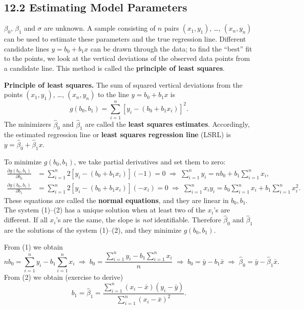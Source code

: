 \subsection*{12.2 Estimating Model Parameters}

$\beta_0$, $\beta_1$ and $\sigma$ are unknown. A sample consisting of $n$ pairs $(x_1,y_1)$, \dots, $(x_n,y_n)$ can be used to estimate these parameters and the true regression line.
Different candidate lines $y=b_0+b_1x$ can be drawn through the data; to find the ``best'' fit to the points, we look at the vertical deviations of the observed data points from a candidate line.
This method is called the \textbf{principle of least squares}.


\textbf{Principle of least squares.} The sum of squared vertical deviations from the points $(x_1,y_1)$, \dots, $(x_n,y_n)$ to the line $y=b_0+b_1x$ is
\[
g(b_0,b_1)=\sum_{i=1}^n\left[y_i-(b_0+b_1x_i)\right]^2 .
\]
The minimizers $\hat\beta_0$ and $\hat\beta_1$ are called the \textbf{least squares estimates}. Accordingly, the estimated regression line or \textbf{least squares regression line} (LSRL) is
$y=\hat\beta_0+\hat\beta_1x$.

To minimize $g(b_0,b_1)$, we take partial derivatives and set them to zero:
\begin{align*}
\frac{\partial g(b_0,b_1)}{\partial b_0} &= \sum_{i=1}^n2\left[y_i-(b_0+b_1x_i)\right](-1)=0
\;\Rightarrow\; \sum_{i=1}^n y_i = nb_0+b_1\sum_{i=1}^n x_i, \tag{1}\\
\frac{\partial g(b_0,b_1)}{\partial b_1} &= \sum_{i=1}^n2\left[y_i-(b_0+b_1x_i)\right](-x_i)=0
\;\Rightarrow\; \sum_{i=1}^n x_iy_i = b_0\sum_{i=1}^n x_i+b_1\sum_{i=1}^n x_i^2. \tag{2}
\end{align*}
These equations are called the \textbf{normal equations}, and they are linear in $b_0,b_1$.
The system (1)--(2) has a unique solution when at least two of the $x_i$'s are different. If all $x_i$'s are the same, the slope is \emph{not} identifiable.
Therefore $\hat\beta_0$ and $\hat\beta_1$ are the solutions of the system (1)--(2), and they minimize $g(b_0,b_1)$.

From (1) we obtain
\[
nb_0 = \sum_{i=1}^n y_i - b_1\sum_{i=1}^n x_i
\;\Rightarrow\; b_0=\frac{\sum_{i=1}^n y_i-b_1\sum_{i=1}^n x_i}{n}
\;\Rightarrow\; b_0 = \bar{y}-b_1\bar{x}
\;\Rightarrow\; \hat\beta_0 = \bar{y}-\hat\beta_1\bar{x}.
\]
From (2) we obtain (exercise to derive)
\[
b_1=\hat\beta_1=\frac{\sum_{i=1}^n(x_i-\bar{x})(y_i-\bar{y})}{\sum_{i=1}^n(x_i-\bar{x})^2}.
\]

